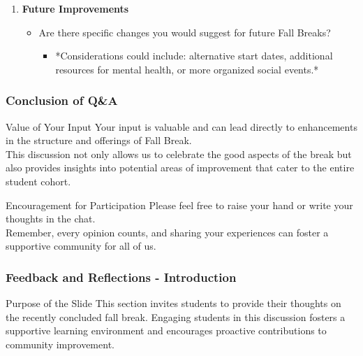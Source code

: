 \documentclass[aspectratio=169]{beamer}
\begin{document}
\begin{frame}[fragile]
\begin{enumerate}
        \item \textbf{Future Improvements}
            \begin{itemize}
                \item Are there specific changes you would suggest for future Fall Breaks?
                    \begin{itemize}
                        \item *Considerations could include: alternative start dates, additional resources for mental health, or more organized social events.*
                    \end{itemize}
            \end{itemize}
    \end{enumerate}
\end{frame}

\begin{frame}[fragile]
    \frametitle{Conclusion of Q\&A}

    \begin{block}{Value of Your Input}
        Your input is valuable and can lead directly to enhancements in the structure and offerings of Fall Break. \\
        This discussion not only allows us to celebrate the good aspects of the break but also provides insights into potential areas of improvement that cater to the entire student cohort.
    \end{block}

    \begin{block}{Encouragement for Participation}
        Please feel free to raise your hand or write your thoughts in the chat. \\
        Remember, every opinion counts, and sharing your experiences can foster a supportive community for all of us.
    \end{block}
\end{frame}

\begin{frame}[fragile]
    \frametitle{Feedback and Reflections - Introduction}
    \begin{block}{Purpose of the Slide}
        This section invites students to provide their thoughts on the recently concluded fall break. Engaging students in this discussion fosters a supportive learning environment and encourages proactive contributions to community improvement.
    \end{block}
\end{frame}
\end{document}
